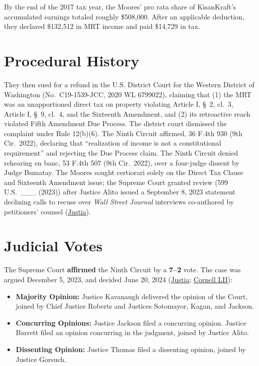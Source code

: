 \documentclass[12pt]{article}
\begin{document}
By the end of the 2017 tax year, the Moores' pro rata share of KisanKraft's accumulated earnings totaled roughly \$508,000. After an applicable deduction, they declared \$132,512 in MRT income and paid \$14,729 in tax.

\section{Procedural History}
They then sued for a refund in the U.S. District Court for the Western District of Washington (No.\ C19-1539-JCC, 2020 WL 6799022), claiming that (1) the MRT was an unapportioned direct tax on property violating Article I, \S\ 2, cl.\ 3, Article I, \S\ 9, cl.\ 4, and the Sixteenth Amendment, and (2) its retroactive reach violated Fifth Amendment Due Process. The district court dismissed the complaint under Rule 12(b)(6). The Ninth Circuit affirmed, 36 F.4th 930 (9th Cir.\ 2022), declaring that ``realization of income is not a constitutional requirement'' and rejecting the Due Process claim. The Ninth Circuit denied rehearing en banc, 53 F.4th 507 (9th Cir.\ 2022), over a four-judge dissent by Judge Bumatay. The Moores sought certiorari solely on the Direct Tax Clause and Sixteenth Amendment issue; the Supreme Court granted review (599 U.S.\ \_\_\_ (2023)) after Justice Alito issued a September 8, 2023 statement declining calls to recuse over \textit{Wall Street Journal} interviews co-authored by petitioners' counsel (\href{https://supreme.justia.com/cases/federal/us/602/22-800/}{Justia}).

\section{Judicial Votes}
The Supreme Court \textbf{affirmed} the Ninth Circuit by a \textbf{7--2} vote. The case was argued December 5, 2023, and decided June 20, 2024 (\href{https://supreme.justia.com/cases/federal/us/602/22-800/}{Justia}; \href{https://www.law.cornell.edu/supremecourt/text/22-800_2024-06-20}{Cornell LII}):

\begin{itemize}
    \item \textbf{Majority Opinion:} Justice Kavanaugh delivered the opinion of the Court, joined by Chief Justice Roberts and Justices Sotomayor, Kagan, and Jackson.
    \item \textbf{Concurring Opinions:} Justice Jackson filed a concurring opinion. Justice Barrett filed an opinion concurring in the judgment, joined by Justice Alito.
    \item \textbf{Dissenting Opinion:} Justice Thomas filed a dissenting opinion, joined by Justice Gorsuch.
\end{itemize}
\end{document}
